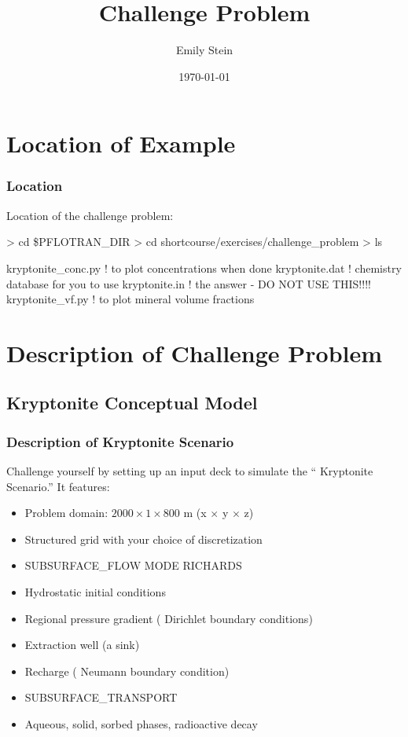 \documentclass{beamer}
\newcommand\gehcomment[1]{{{\color{orange} #1}}}
\newcommand\redcomment[1]{{{\color{red} #1}}}
\newcommand\bluecomment[1]{{{\color{blue} #1}}}
\begin{document}
\title{Challenge Problem}
\author{Emily Stein}
\date{\today}


\section{Location of Example}

\begin{frame}\frametitle{Location}

Location of the challenge problem:

\begin{semiverbatim}
> cd \$PFLOTRAN_DIR
> cd shortcourse/exercises/challenge_problem
> ls

kryptonite_conc.py \bluecomment{! to plot concentrations when done}
kryptonite.dat     \bluecomment{! chemistry database for you to use}
kryptonite.in      \bluecomment{! the answer - DO NOT USE THIS!!!!}
kryptonite_vf.py   \bluecomment{! to plot mineral volume fractions}
\end{semiverbatim}

\end{frame}

\section{Description of Challenge Problem}

\subsection{Kryptonite Conceptual Model}

\begin{frame}\frametitle{Description of Kryptonite Scenario}
Challenge yourself by setting up an input deck to simulate the ``\gehcomment{Kryptonite Scenario}.'' It features:
\begin{itemize}
  \item Problem domain: $2000 \times 1 \times 800$ m (x $\times$ y $\times$ z)
  \item \redcomment{Structured grid} with your choice of discretization
  \item SUBSURFACE\_FLOW MODE \redcomment{RICHARDS}
  \item \redcomment{Hydrostatic} initial conditions
  \item Regional pressure gradient (\redcomment{Dirichlet} boundary conditions)
  \item Extraction well (a \redcomment{sink})
  \item Recharge (\redcomment{Neumann} boundary condition)
  \item SUBSURFACE\_TRANSPORT
  \item Aqueous, solid, sorbed phases, radioactive decay
\end{itemize}

\end{frame}
\end{document}
